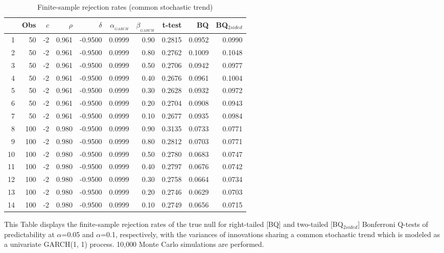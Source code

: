 \documentclass{article}
\begin{document}
\begin{table}[hbt]
\centering
\caption{Finite-sample rejection rates (common stochastic trend)}
\label{tab:cst-garch}
\begin{threeparttable}
\begin{tabular}{rrrrrrrrrr}
  \hline
  & Obs & $c$ & $\rho$ & $\delta$ & $\alpha_{_{GARCH}}$ & $\beta_{_{GARCH}}$ & t-test &BQ& BQ$_{{2sided}}$ \\ 
  \hline
1 & 50 & -2 & 0.961 & -0.9500 & 0.0999 & 0.90 & 0.2815 & 0.0952 & 0.0990 \\ 
  2 & 50 & -2 & 0.961 & -0.9500 & 0.0999 & 0.80 & 0.2762 & 0.1009 & 0.1048 \\ 
  3 & 50 & -2 & 0.961 & -0.9500 & 0.0999 & 0.50 & 0.2706 & 0.0942 & 0.0977 \\ 
  4 & 50 & -2 & 0.961 & -0.9500 & 0.0999 & 0.40 & 0.2676 & 0.0961 & 0.1004 \\ 
  5 & 50 & -2 & 0.961 & -0.9500 & 0.0999 & 0.30 & 0.2628 & 0.0932 & 0.0972 \\ 
  6 & 50 & -2 & 0.961 & -0.9500 & 0.0999 & 0.20 & 0.2704 & 0.0908 & 0.0943 \\ 
  7 & 50 & -2 & 0.961 & -0.9500 & 0.0999 & 0.10 & 0.2677 & 0.0935 & 0.0984 \\ 
  8 & 100 & -2 & 0.980 & -0.9500 & 0.0999 & 0.90 & 0.3135 & 0.0733 & 0.0771 \\ 
  9 & 100 & -2 & 0.980 & -0.9500 & 0.0999 & 0.80 & 0.2812 & 0.0703 & 0.0771 \\ 
  10 & 100 & -2 & 0.980 & -0.9500 & 0.0999 & 0.50 & 0.2780 & 0.0683 & 0.0747 \\ 
  11 & 100 & -2 & 0.980 & -0.9500 & 0.0999 & 0.40 & 0.2797 & 0.0676 & 0.0742 \\ 
  12 & 100 & -2 & 0.980 & -0.9500 & 0.0999 & 0.30 & 0.2758 & 0.0664 & 0.0734 \\ 
  13 & 100 & -2 & 0.980 & -0.9500 & 0.0999 & 0.20 & 0.2746 & 0.0629 & 0.0703 \\ 
  14 & 100 & -2 & 0.980 & -0.9500 & 0.0999 & 0.10 & 0.2749 & 0.0656 & 0.0715 \\ 
   \hline
\end{tabular}
 \begin{tablenotes}
 \small
\item This Table displays the finite-sample rejection rates of the true null for right-tailed [BQ] and two-tailed  [BQ$_{{2sided}}$] Bonferroni Q-tests of predictability at $\alpha$=0.05 and $\alpha$=0.1, respectively, with the variances of innovations sharing a common stochastic trend which is modeled as a univariate GARCH(1, 1) process. 10,000 Monte Carlo simulations are performed.
\end{tablenotes}
\end{threeparttable}
\end{table}
\end{document}
